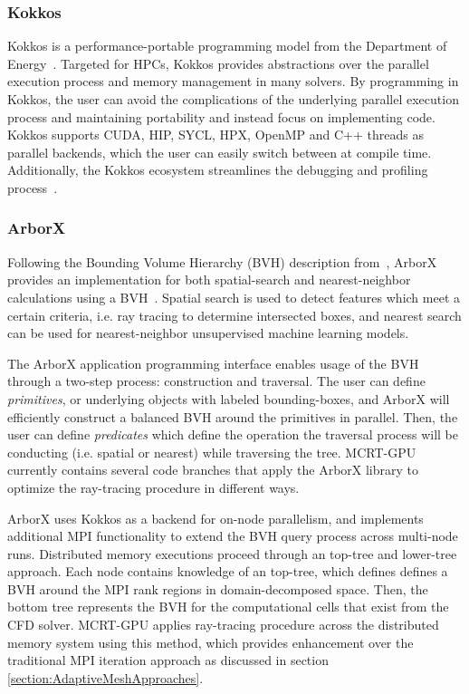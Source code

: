 \subsubsection{Kokkos}
Kokkos is a performance-portable programming model from the Department of Energy~\cite{Trott_Kokkos3_2022,TrottKokkosOGPaper2014}. 
Targeted for HPCs, Kokkos provides abstractions over the parallel execution process and memory management in many solvers. By programming in Kokkos, the user can avoid the complications of the underlying parallel execution process and maintaining portability and instead focus on implementing code.
Kokkos supports CUDA, HIP, SYCL, HPX, OpenMP and C++ threads as parallel backends, which the user can easily switch between at compile time.
Additionally, the Kokkos ecosystem streamlines the debugging and profiling process~\cite{Trott_KokkosEcosystem2021}.

\subsubsection{ArborX}
Following the Bounding Volume Hierarchy (BVH) description from~\citet{Karras2012MaximizingTrees}, ArborX provides an implementation for both spatial-search and nearest-neighbor calculations using a BVH~\cite{Lebrun-Grandie2019ArborX:Library}. Spatial search is used to detect features which meet a certain criteria, i.e. ray tracing to determine intersected boxes, and nearest search can be used for nearest-neighbor unsupervised machine learning models.

The ArborX application programming interface enables usage of the BVH through a two-step process: construction and traversal. The user can define \textit{primitives}, or underlying objects with labeled bounding-boxes, and ArborX will efficiently construct a balanced BVH around the primitives in parallel. Then, the user can define \textit{predicates} which define the operation the traversal process will be conducting (i.e. spatial or nearest) while traversing the tree.
MCRT-GPU currently contains several code branches that apply the ArborX library to optimize the ray-tracing procedure in different ways.

ArborX uses Kokkos as a backend for on-node parallelism, and implements additional MPI functionality to extend the BVH query process across multi-node runs. Distributed memory executions proceed through an top-tree and lower-tree approach.
Each node contains knowledge of an top-tree, which defines defines a BVH around the MPI rank regions in domain-decomposed space. Then, the bottom tree represents the BVH for the computational cells that exist from the CFD solver.
MCRT-GPU applies ray-tracing procedure across the distributed memory system using this method, which provides enhancement over the traditional MPI iteration approach as discussed in section \ref{section:AdaptiveMeshApproaches}.


